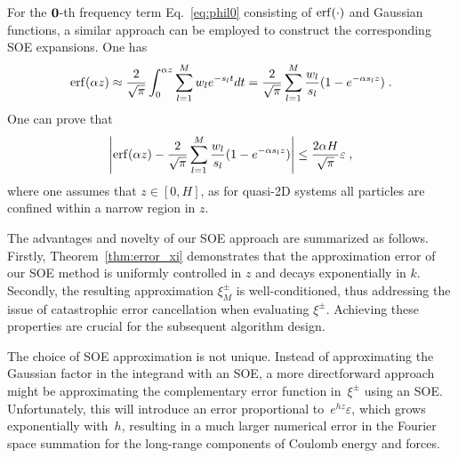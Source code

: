For the $\boldsymbol{0}$-th frequency term Eq.~\eqref{eq:phil0} consisting of $\operatorname{erf}(\cdot)$ and Gaussian functions, a similar approach can be employed to construct the corresponding SOE expansions. One has
\begin{equation}\label{eq:SOErf}
	\begin{split}
		\operatorname{erf}(\alpha z)\approx \frac{2}{\sqrt{\pi}} \int_0^{\alpha z} \sum_{l = 1}^M w_l e^{-s_l t} dt= \frac{2}{\sqrt{\pi}} \sum_{l = 1}^M \frac{w_l}{s_l} (1 - e^{- \alpha s_l z})\;.
	\end{split}
\end{equation}
One can prove that
\begin{equation}\label{eq::erfSOE}
	\left|\operatorname{erf}(\alpha z)-\frac{2}{\sqrt{\pi}} \sum_{l = 1}^M \frac{w_l}{s_l} (1 - e^{- \alpha s_l z})\right|\leq \frac{2\alpha H}{\sqrt{\pi}}\varepsilon\;,
\end{equation}
where one assumes that $z\in[0, H]$, as for quasi-2D systems all particles are confined within a narrow region in $z$. 

The advantages and novelty of our SOE approach are summarized as follows.
Firstly, Theorem~\ref{thm:error_xi} demonstrates that the approximation error of our SOE method is uniformly controlled in $z$ and decays exponentially in $k$. Secondly, the resulting approximation $\xi_{M}^{\pm}$ is well-conditioned, thus addressing the issue of catastrophic error cancellation when evaluating $\xi^{\pm}$. 
Achieving these properties are crucial for the subsequent algorithm design.

\begin{rmk}
	The choice of SOE approximation is not unique. Instead of approximating the Gaussian factor in the integrand with an SOE, a more directforward approach might be approximating the complementary error function in~$\xi^{\pm}$ using an SOE. 
	Unfortunately, this will introduce an error proportional to~$e^{hz} \varepsilon$, which grows exponentially with~$h$, resulting in a much larger numerical error in the Fourier space summation for the long-range components of Coulomb energy and forces.
\end{rmk}	


